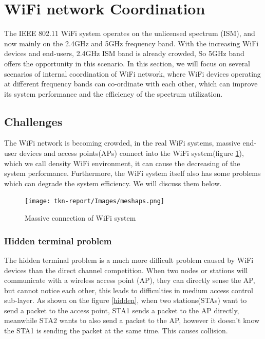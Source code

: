 \documentclass{IEEEtran}
\begin{document}
\section{WiFi network Coordination}
The IEEE 802.11 WiFi system operates on the unlicensed spectrum (ISM), and now mainly on the 2.4GHz and 5GHz frequency band. With the increasing WiFi devices and end-users, 2.4GHz ISM band is already crowded, So 5GHz band offers the opportunity in this scenario. In this section, we will focus on several scenarios of internal coordination of WiFi network, where WiFi devices operating at different frequency bands can co-ordinate with each other, which can improve its system performance and the efficiency of the spectrum utilization.

\subsection{Challenges}

The WiFi network is becoming crowded, in the real WiFi systems, massive end-user devices and access points(APs) connect into the WiFi system(figure \ref{massive}), which we call density WiFi environment, it can cause the decreasing of the system performance\cite{Bhalla2016}. Furthermore, the WiFi system itself also has some problems which can degrade the system efficiency. We will discuss them below.

\graphicspath{{Images/}}
\maketitle
\begin{figure}[htp]
\centering
\texttt{[image: tkn-report/Images/meshaps.png]}
\caption{Massive connection of WiFi system}
\label{massive}
\end{figure}

\subsubsection{Hidden terminal problem}
The hidden terminal problem is a much more difficult problem caused by WiFi devices than the direct channel competition\cite {Park2014}. When two nodes or stations will communicate with a wireless access point (AP), they can directly sense the AP, but cannot notice each other, this leads to difficulties in medium access control sub-layer. As shown on the figure \ref{hidden}, when two stations(STAs) want to send a packet to the access point, STA1 sends a packet to the AP directly, meanwhile STA2 wants to also send a packet to the AP, however it doesn't know the STA1 is sending the packet at the same time. This causes collision.
\end{document}
